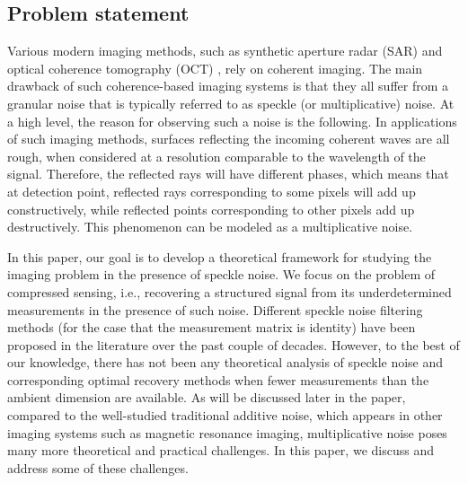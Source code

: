 \documentclass[onecolumn]{IEEEtran}
\begin{document}
\subsection{Problem statement}
Various modern imaging methods, such as synthetic aperture radar (SAR) \cite{moreira2013tutorial} and optical coherence tomography (OCT) \cite{huang1991optical}, rely on coherent imaging. The main drawback of such coherence-based imaging systems is that they all suffer from a granular noise that is typically referred to as speckle (or multiplicative)  noise. At a high level, the reason for observing such a noise is the following. In  applications of such imaging methods, surfaces reflecting the incoming coherent waves are all rough, when considered  at a resolution  comparable to the wavelength of the signal. Therefore, the reflected rays will have different phases, which means that at detection point, reflected rays corresponding to some pixels will  add up constructively, while reflected points corresponding to other pixels add up destructively. This phenomenon can be modeled as a multiplicative noise. 

  In this paper, our goal is to develop a theoretical framework for studying the imaging problem in the presence of speckle noise. We focus on the problem of compressed sensing, i.e., recovering a structured signal from its underdetermined measurements in the presence of such noise.  Different  speckle noise filtering methods (for the case that the measurement matrix is identity) have been proposed in the literature over the past couple of decades. However, to the best of our knowledge,  there  has not been  any theoretical  analysis of speckle noise and corresponding optimal recovery methods when fewer measurements than the ambient dimension are available. As will be discussed later in the paper, compared to the well-studied traditional additive noise, which appears in other imaging systems such as magnetic resonance imaging, multiplicative noise poses many more theoretical and practical challenges. In this paper, we discuss and address some of these challenges. 
    
\end{document}
